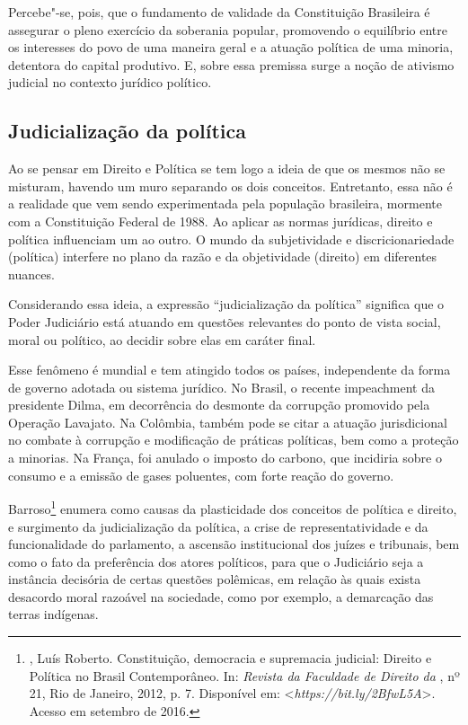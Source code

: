 Percebe"-se, pois, que o fundamento de validade da Constituição
Brasileira é assegurar o pleno exercício da soberania popular,
promovendo o equilíbrio entre os interesses do povo de uma maneira geral
e a atuação política de uma minoria, detentora do capital produtivo. E,
sobre essa premissa surge a noção de ativismo judicial no contexto
jurídico político.

\subsection{Judicialização da política}

Ao se pensar em Direito e Política se tem logo a ideia de que os mesmos
não se misturam, havendo um muro separando os dois conceitos.
Entretanto, essa não é a realidade que vem sendo experimentada pela
população brasileira, mormente com a Constituição Federal de 1988. Ao
aplicar as normas jurídicas, direito e política influenciam um ao outro.
O mundo da subjetividade e discricionariedade (política) interfere no
plano da razão e da objetividade (direito) em diferentes nuances.

Considerando essa ideia, a expressão ``judicialização da política''
significa que o Poder Judiciário está atuando em questões relevantes do
ponto de vista social, moral ou político, ao decidir sobre elas em
caráter final.

Esse fenômeno é mundial e tem atingido todos os países, independente da
forma de governo adotada ou sistema jurídico. No Brasil, o recente
impeachment da presidente Dilma, em decorrência do desmonte da corrupção
promovido pela Operação Lavajato. Na Colômbia, também pode se citar a
atuação jurisdicional no combate à corrupção e modificação de práticas
políticas, bem como a proteção a minorias. Na França, foi anulado o
imposto do carbono, que incidiria sobre o consumo e a emissão de gases
poluentes, com forte reação do governo.

Barroso\footnote{, Luís Roberto. Constituição,
  democracia e supremacia judicial: Direito e Política no Brasil
  Contemporâneo. In: \emph{Revista da Faculdade de Direito da }, nº 21, Rio de
  Janeiro, 2012, p. 7. Disponível em: \textless{}\emph{https://bit.ly/2BfwL5A}\textgreater{}. 
Acesso em setembro de 2016.} enumera como causas da plasticidade
dos conceitos de política e direito, e surgimento da judicialização da
política, a crise de representatividade e da funcionalidade do
parlamento, a ascensão institucional dos juízes e tribunais, bem como o
fato da preferência dos atores políticos, para que o Judiciário seja a
instância decisória de certas questões polêmicas, em relação às quais
exista desacordo moral razoável na sociedade, como por exemplo, a
demarcação das terras indígenas.

